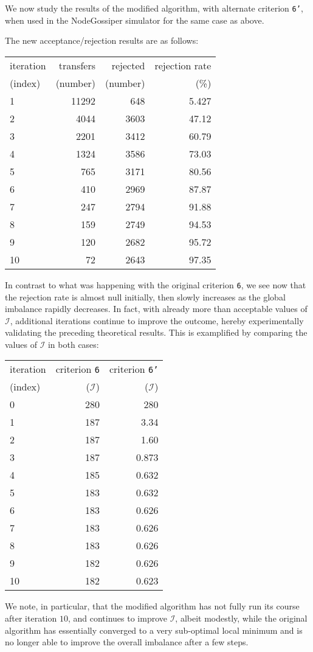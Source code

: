We now study the results of the modified algorithm, with alternate
criterion \texttt{6'}, when used in the \textsf{NodeGossiper}
simulator for the same case as above.

The new acceptance/rejection results are as follows:
\begin{center}
\begin{tabular}{@{}lrrr@{}}
\hline
iteration & transfers & rejected & rejection rate\\
(index)   & (number)  & (number) & (\%)\\
\hline\hline
 1 & 11292 &  648 & 5.427\\
 2 &  4044 & 3603 & 47.12\\
 3 &  2201 & 3412 & 60.79\\
 4 &  1324 & 3586 & 73.03\\
 5 &   765 & 3171 & 80.56\\
 6 &   410 & 2969 & 87.87\\
 7 &   247 & 2794 & 91.88\\
 8 &   159 & 2749 & 94.53\\
 9 &   120 & 2682 & 95.72\\
10 &    72 & 2643 & 97.35\\
\hline
\end{tabular}
\end{center}

In contrast to what was happening with the original criterion
\texttt{6}, we see now that the rejection rate is almost null
initially, then slowly increases as the global imbalance rapidly decreases.
In fact, with already more than acceptable values of $\mathcal{I}$,
additional iterations continue to improve the outcome, hereby
experimentally validating the preceding theoretical results. This is
examplified by comparing the values of $\mathcal{I}$ in both cases:
\begin{center}
\begin{tabular}{@{}lrr@{}}
\hline
iteration & criterion \texttt{6}  & criterion \texttt{6'} \\
(index)   & ($\mathcal{I}$) & ($\mathcal{I}$) \\
\hline\hline
 0 & 280 &   280\\
 1 & 187 &  3.34\\
 2 & 187 &  1.60\\
 3 & 187 & 0.873\\
 4 & 185 & 0.632\\
 5 & 183 & 0.632 \\
 6 & 183 & 0.626 \\
 7 & 183 & 0.626 \\
 8 & 183 & 0.626 \\
 9 & 182 & 0.626 \\
10 & 182 & 0.623 \\
\hline
\end{tabular}
\end{center}
We note, in particular, that the modified algorithm has not fully run
its course after iteration $10$, and continues to improve
$\mathcal{I}$, albeit modestly, while the original algorithm has
essentially converged to a very sub-optimal local minimum and is no
longer able to improve the overall imbalance after a few steps.
